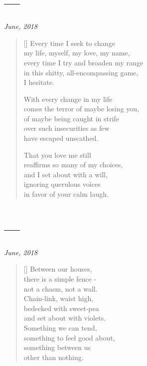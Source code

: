 \section{---}

\hfill\textit{June, 2018}

\begin{verse}[\textwidth]
  Every time I seek to change\\
  my life, myself, my love, my name,\\
  every time I try and broaden my range\\
  in this shitty, all-encompassing game,\\
  I hesitate.

  With every change in my life\\
  comes the terror of maybe losing you,\\
  of maybe being caught in strife\\
  over such insecurities as few\\
  have escaped unscathed.

  That you love me still\\
  reaffirms so many of my choices,\\
  and I set about with a will,\\
  ignoring querulous voices\\
  in favor of your calm laugh.
\end{verse}
\newpage

\section{---}

\hfill\textit{June, 2018}

\begin{verse}[\textwidth]
  Between our houses,\\
  there is a simple fence -\\
  not a chasm, not a wall.\\
  Chain-link, waist high,\\
  bedecked with sweet-pea\\
  and set about with violets.\\
  Something we can tend,\\
  something to feel good about,\\
  something between us\\
  other than nothing.
\end{verse}
\newpage

